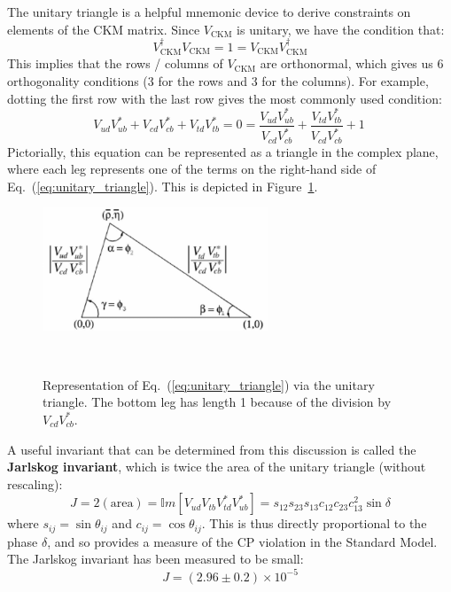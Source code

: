 \documentclass[11pt, oneside]{article}   	%
\theoremstyle{definition}
\numberwithin{equation}{subsection}		%
\begin{document}
The unitary triangle is a helpful mnemonic device to derive constraints on elements of the CKM matrix. Since $V_\mathrm{CKM}$ is 
unitary, we have the condition that:
\begin{equation}
	V_\mathrm{CKM}^\dagger V_\mathrm{CKM} = 1 = V_\mathrm{CKM} V_\mathrm{CKM}^\dagger
\end{equation}
This implies that the rows / columns of $V_\mathrm{CKM}$ are orthonormal, which gives us 6 orthogonality conditions (3 for the rows and 3 
for the columns). For example, dotting the first row with the last row gives the most commonly used condition:
\begin{equation}
	V_{ud} V_{ub}^* + V_{cd} V_{cb}^* + V_{td} V_{tb}^* = 0 = \frac{V_{ud} V_{ub}^*}{V_{cd} V_{cb}^*} + \frac{V_{td} V_{tb}^*}{V_{cd} 
	V_{cb}^*} + 1~
	\label{eq:unitary_triangle}
\end{equation}
Pictorially, this equation can be represented as a triangle in the complex plane, where each leg represents one of the terms on the right-hand 
side of Eq.~(\ref{eq:unitary_triangle}). This is depicted in Figure~\ref{fig:unitary_triangle}. 
\begin{figure}[H]
	\centering
	\includegraphics[width = 0.6\textwidth]{unitary_triangle}
	\caption{Representation of Eq.~(\ref{eq:unitary_triangle}) via the unitary triangle. The bottom leg has length 1 because of the 
	division by $V_{cd} V_{cb}^*$.}~
	\label{fig:unitary_triangle}
\end{figure}

A useful invariant that can be determined from this discussion is called the \textbf{Jarlskog invariant}, which is twice the area of the unitary 
triangle (without rescaling):
\begin{equation}
	J = 2(\mathrm{area}) = \mathbb Im\left[ V_{ud} V_{tb} V_{td}^* V_{ub}^* \right] = s_{12} s_{23} s_{13} c_{12} c_{23} c_{13}^2\sin\delta
\end{equation}
where $s_{ij} = \sin\theta_{ij}$ and $c_{ij} = \cos\theta_{ij}$. This is thus directly proportional to the phase $\delta$, and so provides a 
measure of the CP violation in the Standard Model. The Jarlskog invariant has been measured to be small:
\begin{equation}
	J = (2.96\pm 0.2) \times 10^{-5}
\end{equation}
\end{document}
